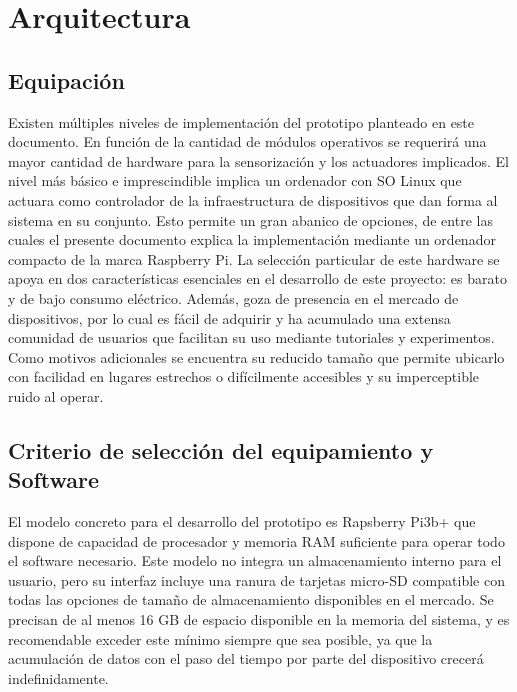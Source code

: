 \cleardoublepage

\chapter{Arquitectura}
\label{makereference4}


\section{Equipación}
\label{makereference4.1}

Existen múltiples niveles de implementación del prototipo planteado en este documento. En función de la cantidad de módulos operativos se requerirá una mayor cantidad de hardware para la sensorización y los actuadores implicados. El nivel más básico e imprescindible implica un ordenador con SO Linux que actuara como controlador de la infraestructura de dispositivos que dan forma al sistema en su conjunto. Esto permite un gran abanico de opciones, de entre las cuales el presente documento explica la implementación mediante un ordenador compacto de la marca Raspberry Pi. La selección particular de este hardware se apoya en dos características esenciales en el desarrollo de este proyecto: es barato y de bajo consumo eléctrico. Además, goza de presencia en el mercado de dispositivos, por lo cual es fácil de adquirir y ha acumulado una extensa comunidad de usuarios que facilitan su uso mediante tutoriales y experimentos. Como motivos adicionales se encuentra su reducido tamaño que permite ubicarlo con facilidad en lugares estrechos o difícilmente accesibles y su imperceptible ruido al operar.

\section{Criterio de selección del equipamiento y Software}
\label{makereference1.4}
El modelo concreto para el desarrollo del prototipo es Rapsberry Pi3b+ que dispone de capacidad de procesador y memoria RAM suficiente para operar todo el software necesario. Este modelo no integra un almacenamiento interno para el usuario, pero su interfaz incluye una ranura de tarjetas micro-SD compatible con todas las opciones de tamaño de almacenamiento disponibles en el mercado. Se precisan de al menos 16 GB de espacio disponible en la memoria del sistema, y es recomendable exceder este mínimo siempre que sea posible, ya que la acumulación de datos con el paso del tiempo por parte del dispositivo crecerá indefinidamente.

